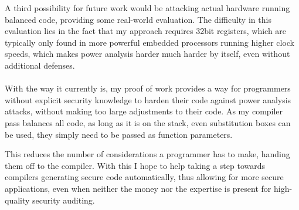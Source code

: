 A third possibility for future work would be attacking actual hardware running balanced code, providing some real-world evaluation.
The difficulty in this evaluation lies in the fact that my approach requires 32bit registers, which are typically only found in more powerful embedded processors running higher clock speeds, which makes power analysis harder much harder by itself, even without additional defenses.
\\
\\
With the way it currently is, my proof of work provides a way for programmers without explicit security knowledge to harden their code against power analysis attacks, without making too large adjustments to their code.
As my compiler pass balances all code, as long as it is on the stack, even substitution boxes can be used, they simply need to be passed as function parameters.

This reduces the number of considerations a programmer has to make, handing them off to the compiler.
With this I hope to help taking a step towards compilers generating secure code automatically, thus allowing for more secure applications, even when neither the money nor the expertise is present for high-quality security auditing.
